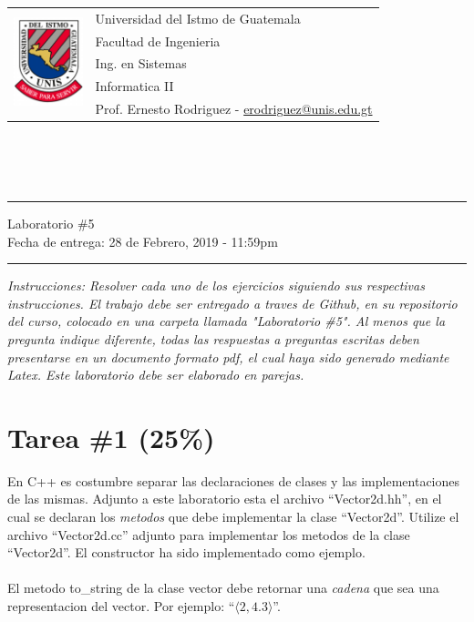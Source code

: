 \documentclass{article}
\newcommand{\horrule}[1]{\rule{\linewidth}{#1}}
\begin{document}
\begin{tabular}{l l}
\multirow{5}{*}{\includegraphics[width=2cm]{../../recursos/logo.png}} & Universidad del Istmo de Guatemala \\
 & Facultad de Ingenieria \\
 & Ing. en Sistemas \\
 & Informatica II \\
 & Prof. Ernesto Rodriguez - \href{mailto:erodriguez@unis.edu.gt}{erodriguez@unis.edu.gt} \\
\end{tabular}
\\\\\\

\begin{center}
        \horrule{0.5pt}
        \huge{Laboratorio \#5} \\
        \large{Fecha de entrega: 28 de Febrero, 2019 - 11:59pm} \\
        \horrule{1pt}
\end{center}

\emph{Instrucciones: Resolver cada uno de los ejercicios siguiendo sus respectivas
instrucciones. El trabajo debe ser entregado a traves de Github, en su repositorio del curso, colocado en una carpeta llamada "Laboratorio \#5".
Al menos que la pregunta indique diferente, todas las respuestas a preguntas escritas deben presentarse en
un documento formato pdf, el cual haya sido generado mediante Latex. Este laboratorio
debe ser elaborado en parejas.}

\section*{Tarea \#1 (25\%)}
\label{tarea1}

En C++ es costumbre separar las declaraciones de clases y las implementaciones de las mismas. Adjunto a este
laboratorio esta el archivo ``Vector2d.hh'', en el cual se declaran los \emph{metodos}
que debe implementar la clase ``Vector2d''. Utilize el archivo ``Vector2d.cc'' adjunto para
implementar los metodos de la clase ``Vector2d''. El constructor ha sido implementado
como ejemplo.
\\\\
El metodo to\_string de la clase vector debe retornar una \emph{cadena}
que sea una representacion del vector. Por ejemplo: ``$\langle 2,4.3 \rangle$''.
\end{document}
